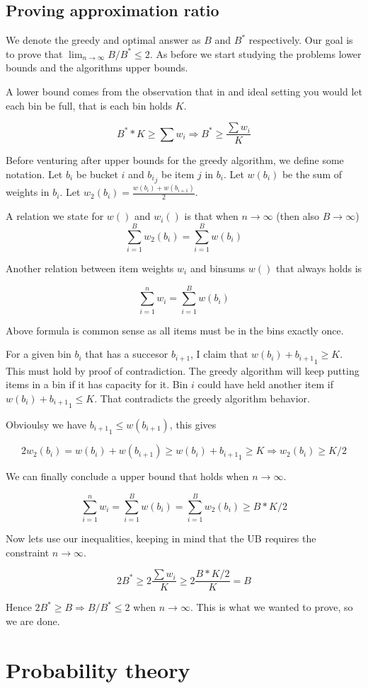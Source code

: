 \documentclass[a4paper,11pt]{article}
\begin{document}
\subsection{Proving approximation ratio}

We denote the greedy and optimal answer as $B$ and $B^*$ respectively.
Our goal is to prove that $\lim_{n \to \infty} B/B^* \leq 2$. As before we
start studying the problems lower bounds and the algorithms upper bounds.

A lower bound comes from the observation that in and ideal setting you would
let each bin be full, that is each bin holds $K$.

\[
 B^* * K \geq \sum w_i \Rightarrow B^* \geq \frac{\sum w_i}{K}
\]

Before venturing after upper bounds for the greedy algorithm, we define some
notation.
Let ${b_i}$ be bucket $i$ and ${b_i}_j$ be item $j$ in ${b_i}$.
Let $w({b_i})$ be the sum of weights in ${b_i}$.
Let $w_2({b_i}) = \frac{w({b_i}) + w(b_{i+1})}{2}$.

A relation we state for $w()$ and $w_i()$ is that when $n \to \infty$ (then
also $B \to \infty$)
\[
 \sum_{i=1}^{B} w_2({b_i}) = \sum_{i=1}^{B} w({b_i})
\]

Another relation between item weights $w_i$ and binsums $w()$ that always holds
is

\[
 \sum_{i=1}^{n} w_i = \sum_{i=1}^{B} w({b_i})
\]

Above formula is common sense as all items must be in the bins exactly once.

For a given bin ${b_i}$ that has a succesor $b_{i+1}$, I claim that
$w({b_i}) + {b_{i+1}}_1 \geq K$. This must hold by proof of contradiction.
The greedy algorithm will keep putting items in a bin if it has capacity for it.
Bin $i$ could have
held another item if $w({b_i}) + {b_{i+1}}_1 \leq K$. That contradicts the greedy
algorithm behavior.

Obvioulsy we have ${b_{i+1}}_1 \leq w(b_{i+1})$, this gives

\[
 2w_2({b_i}) = w({b_i}) + w(b_{i+1}) \geq w({b_i}) + {b_{i+1}}_1 \geq K
 \Rightarrow w_2({b_i}) \geq K/2
\]

We can finally conclude a upper bound that holds when $n \to \infty$.

\[
 \sum_{i=1}^{n} w_i = \sum_{i=1}^{B} w({b_i}) = \sum_{i=1}^{B} w_2({b_i}) \geq B*K/2
\]

Now lets use our inequalities, keeping in mind that the UB requires the
constraint $n \to \infty$.

\[
 2B^* \geq 2 \frac{\sum w_i}{K} \geq 2 \frac{B*K/2}{K} = B
\]

Hence $2B^* \geq B \Rightarrow B/B^* \leq 2 $ when $n \to \infty$.
This is what we wanted to prove, so we are done.


\section{Probability theory}
\end{document}
